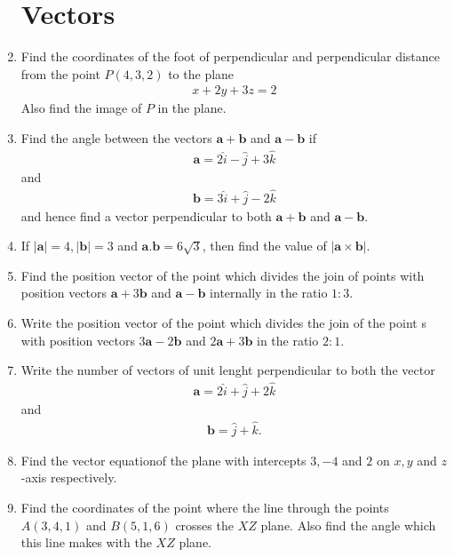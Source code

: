 \documentclass[12pt,-letter paper]{article}
\let\vec\mathbf{}
\let\vec\mathbf{}
\let\vec\mathbf{}
\theoremstyle{remark}
\providecommand{\brak}[1]{\ensuremath{\left(#1\right)}}
\providecommand{\abs}[1]{\left\vert#1\right\vert}
\begin{document}
\begin{enumerate}
            \section{Vectors}
      \item Find the coordinates of the foot of perpendicular and perpendicular distance from the point $P\brak{4, 3, 2}$ to the plane
            \begin{align*}
                  x+2y+3z=2
            \end{align*}
            Also find the image of $P$ in the plane.
      \item Find the angle between the vectors $\vec{a} + \vec{b}$ and $\vec{a}-\vec{b}$ if
            \begin{align*}
                  \vec{a}=2\hat{i}-\hat{j}+3\hat{k}
            \end{align*}
            and
            \begin{align*}
                  \vec{b}= 3\hat{i} + \hat{j} -2\hat{k}
            \end{align*}
            and hence find a vector perpendicular to both $\vec{a}+\vec{b}$ and $\vec{a}-\vec{b}$.
      \item If  $\abs{\vec{a}} = 4 , \abs{\vec{b}}=3$  and $\vec{a}.\vec{b}=6\sqrt{3}$, then find the value of $\abs{\vec{a}\times \vec{b}}$.
      \item Find the position vector of the point which divides the join of points with position vectors $\vec{a}+3\vec{b}$ and $\vec{a}-\vec{b}$ internally in the ratio $1:3$.
      \item Write the position vector of the point which divides the join of the point s with position vectors $3\vec{a} - 2\vec{b}$ and $2\vec{a} + 3\vec{b}$ in the ratio $2:1$.
      \item Write the number of vectors of unit lenght perpendicular to both the vector
            \begin{align*}
                  \vec{a} = 2 \hat{i} + \hat{j} +2\hat{k}
            \end{align*}
            and
            \begin{align*}
                  \vec{b}= \hat{j}+\hat{k}.
            \end{align*}
      \item Find the vector equationof the plane with intercepts $3,-4$ and $2$ on $x,y$ and  $z$-axis respectively.
      \item Find the coordinates of the point where the line through the points $A\brak{3,4,1}$ and $B\brak{5,1,6}$ crosses the $XZ$ plane. Also find the angle which this line makes with the $XZ$ plane.

\end{enumerate}
\end{document}
